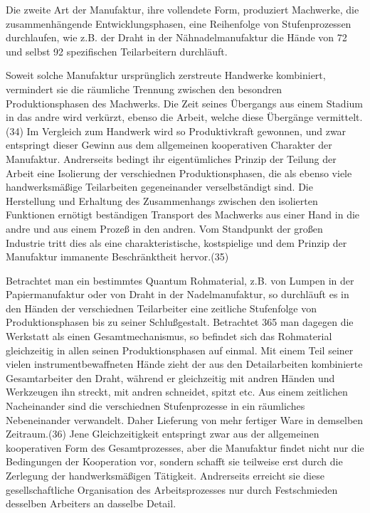 {Die zweite Art der Manufaktur, ihre vollendete Form, produziert
Machwerke, die zusammenhängende Entwicklungsphasen, eine Reihenfolge von
Stufenprozessen durchlaufen, wie z.B. der Draht in der
Nähnadelmanufaktur die Hände von 72 und selbst 92 spezifischen
Teilarbeitern durchläuft.

Soweit solche Manufaktur ursprünglich zerstreute Handwerke kombiniert,
vermindert sie die räumliche Trennung zwischen den besondren
Produktionsphasen des Machwerks. Die Zeit seines Übergangs aus einem
Stadium in das andre wird verkürzt, ebenso die Arbeit, welche diese
Übergänge vermittelt.(34) Im Vergleich zum Handwerk wird so
Produktivkraft gewonnen, und zwar entspringt dieser Gewinn aus dem
allgemeinen kooperativen Charakter der Manufaktur. Andrerseits bedingt
ihr eigentümliches Prinzip der Teilung der Arbeit eine Isolierung der
verschiednen Produktionsphasen, die als ebenso viele handwerksmäßige
Teilarbeiten gegeneinander verselbständigt sind. Die Herstellung und
Erhaltung des Zusammenhangs zwischen den isolierten Funktionen ernötigt
beständigen Transport des Machwerks aus einer Hand in die andre und aus
einem Prozeß in den andren. Vom Standpunkt der großen Industrie tritt
dies als eine charakteristische, kostspielige und dem Prinzip der
Manufaktur immanente Beschränktheit hervor.(35)

Betrachtet man ein bestimmtes Quantum Rohmaterial, z.B. von Lumpen in
der Papiermanufaktur oder von Draht in der Nadelmanufaktur, so
durchläuft es in den Händen der verschiednen Teilarbeiter eine zeitliche
Stufenfolge von Produktionsphasen bis zu seiner Schlußgestalt.
Betrachtet \num{365} man dagegen die Werkstatt als
einen Gesamtmechanismus, so befindet sich das Rohmaterial gleichzeitig
in allen seinen Produktionsphasen auf einmal. Mit einem Teil seiner
vielen instrumentbewaffneten Hände zieht der aus den Detailarbeiten
kombinierte Gesamtarbeiter den Draht, während er gleichzeitig mit andren
Händen und Werkzeugen ihn streckt, mit andren schneidet, spitzt etc. Aus
einem zeitlichen Nacheinander sind die verschiednen Stufenprozesse in
ein räumliches Nebeneinander verwandelt. Daher Lieferung von mehr
fertiger Ware in demselben Zeitraum.(36) Jene Gleichzeitigkeit
entspringt zwar aus der allgemeinen kooperativen Form des
Gesamtprozesses, aber die Manufaktur findet nicht nur die Bedingungen
der Kooperation vor, sondern schafft sie teilweise erst durch die
Zerlegung der handwerksmäßigen Tätigkeit. Andrerseits erreicht sie diese
gesellschaftliche Organisation des Arbeitsprozesses nur durch
Festschmieden desselben Arbeiters an dasselbe Detail.

}
